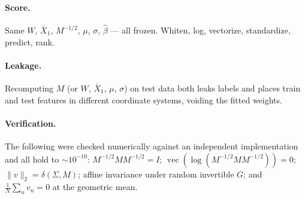 \documentclass[11pt]{article}
\newcommand{\vect}{\operatorname{vec}}
\begin{document}
\paragraph{Score.}
Same $W$, $\bar{X}_1$, $M^{-1/2}$, $\mu$, $\sigma$, $\hat\beta$ ---
all frozen. Whiten, log, vectorize, standardize, predict, rank.

\paragraph{Leakage.} Recomputing $M$ (or $W$, $\bar{X}_1$, $\mu$,
$\sigma$) on test data both leaks labels and places train and test
features in different coordinate systems, voiding the fitted weights.

\paragraph{Verification.} The following were checked numerically
against an independent implementation and all hold to $\sim\!10^{-10}$:
$M^{-1/2} M M^{-1/2} = I$; $\vect(\log(M^{-1/2}MM^{-1/2})) = 0$;
$\|v\|_2 = \delta(\Sigma,M)$; affine invariance under random invertible
$G$; and $\frac{1}{N}\sum_n v_n = 0$ at the geometric mean.
\end{document}
